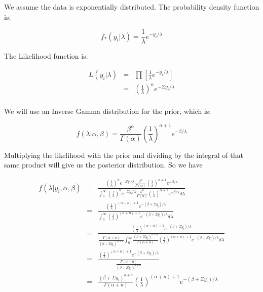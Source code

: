 \documentclass[12pt]{article}
\begin{document}
\noindent We assume the data is exponentially distributed.  The probability density function is:

\[f_*(y_i|\lambda)=\frac{1}{\lambda}e^{-y_i/\lambda} \]

\noindent The Likelihood function is:

\begin{eqnarray*}
L(y_i|\lambda) &=& \prod\left[\frac{1}{\lambda}e^{-y_i/\lambda}\right] \\
&=& \left(\frac{1}{\lambda}\right)^ne^{-\Sigma y_i/\lambda} \\
\end{eqnarray*}

\noindent We will use an Inverse Gamma distribution for the prior, which is:

\[f(\lambda|\alpha,\beta)=\frac{\beta^\alpha}{\Gamma(\alpha)}\left(\frac{1}{\lambda}\right)^{\alpha+1}e^{-\beta/\lambda}\]

\noindent Multiplying the likelihood with the prior and dividing by the integral of that same product will give us the posterior distribution.  So we have

\begin{eqnarray*}
f(\lambda|y_i,\alpha,\beta) &=& \frac{\left(\frac{1}{\lambda}\right)^ne^{-\Sigma y_i/\lambda}\frac{\beta^\alpha}{\Gamma(\alpha)}\left(\frac{1}{\lambda}\right)^{\alpha+1}e^{-\beta/\lambda}}{\int_o^\infty \left(\frac{1}{\lambda}\right)^ne^{-\Sigma y_i/\lambda}\frac{\beta^\alpha}{\Gamma(\alpha)}\left(\frac{1}{\lambda}\right)^{\alpha+1}e^{-\beta/\lambda}d\lambda} \\
&=& \frac{\left(\frac{1}{\lambda}\right)^{(\alpha+n)+1}e^{-(\beta+\Sigma y_i)/\lambda}}{\int_0^\infty \left(\frac{1}{\lambda}\right)^{(\alpha+n)+1}e^{-(\beta+\Sigma y_i)/\lambda}d\lambda} \\
&=& \frac{\left(\frac{1}{\lambda}\right)^{(\alpha+n)+1}e^{-(\beta+\Sigma y_i)/\lambda}}{\frac{\Gamma(\alpha+n)}{(\beta+\Sigma y_i)^{\alpha+n}}\int_0^\infty \frac{(\beta+\Sigma y_i)^{\alpha+n}}{\Gamma(\alpha+n)}\left(\frac{1}{\lambda}\right)^{(\alpha+n)+1}e^{-(\beta+\Sigma y_i)/\lambda}d\lambda} \\
&=& \frac{\left(\frac{1}{\lambda}\right)^{(\alpha+n)+1}e^{-(\beta+\Sigma y_i)/\lambda}}{\frac{\Gamma(\alpha+n)}{(\beta+\Sigma y_i)^{\alpha+n}}} \\
&=& \frac{(\beta+\Sigma y_i)^{\alpha+n}}{\Gamma(\alpha+n)}\left(\frac{1}{\lambda}\right)^{(\alpha+n)+1}e^{-(\beta+\Sigma y_i)/\lambda} \\
\end{eqnarray*}
\end{document}
